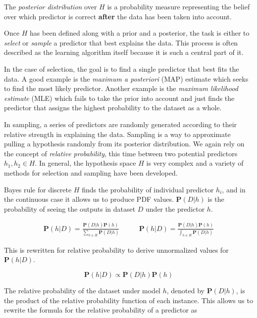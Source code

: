 \documentclass[twoside]{article}
\begin{document}
The \textit{posterior distribution} over \(H\) is a probability measure representing the belief over which predictor is correct \textbf{after} the data has been taken into account. 

Once \(H\) has been defined along with a prior and a posterior, the task is either to \textit{select} or \textit{sample} a predictor that best explains the data. This process is often described as the learning algorithm itself because it is such a central part of it.

In the case of selection, the goal is to find a single predictor that best fits the data. A good example is the \textit{maximum a posteriori} (MAP) estimate which seeks to find the most likely predictor. Another example is the \textit{maximum likelihood estimate} (MLE) which fails to take the prior into account and just finds the predictor that assigns the highest probability to the dataset as a whole.

In sampling, a series of predictors are randomly generated according to their relative strength in explaining the data. Sampling is a way to approximate pulling a hypothesis randomly from its posterior distribution. We again rely on the concept of \textit{relative probability}, this time between two potential predictors \(h_1, h_2 \in H\). In general, the hypothesis space \(H\) is very complex and a variety of methods for selection and sampling have been developed.\cite{sklar_dirichlet}\cite{gelman}

Bayes rule for discrete \(H\) finds the probability of individual predictor \(h_i\), and in the continuous case it allows us to produce PDF values. \(\mathbf{P}(D|h)\) is the probability of seeing the outputs in dataset \(D\) under the predictor \(h\).

\begin{align}
\mathbf{P}(h|D)=\frac{\mathbf{P}(D|h)\mathbf{P}(h)}{\sum_{h \in H}\mathbf{P}(D|h)} &
\qquad\mathbf{P}(h|D)=\frac{\mathbf{P}(D|h)\mathbf{P}(h)}{\int_{h \in H}\mathbf{P}(D|h)}
\end{align}

This is rewritten for relative probability to derive unnormalized values for \(\mathbf{P}(h|D)\).

\begin{equation}
\label{eq:bayes}
\mathbf{P}(h|D)\propto\mathbf{P}(D|h)\mathbf{P}(h)
\end{equation}

The relative probability of the dataset under model \(h\), denoted by \(\mathbf{P}(D|h)\), is the product of the relative probability function of each instance. This allows us to rewrite the formula for the relative probability of a predictor as
\end{document}
